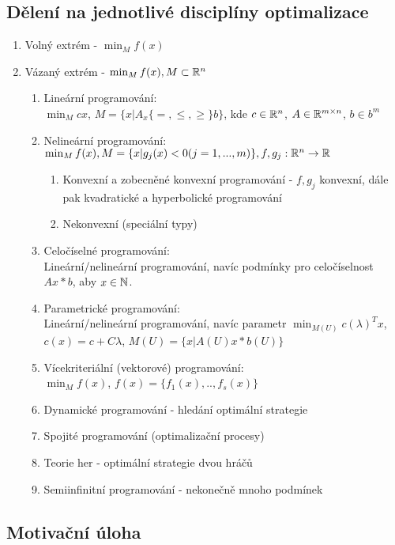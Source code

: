 \documentclass[a4paper,12pt,titlepage]{article}
\begin{document}
\subsection{Dělení na jednotlivé disciplíny optimalizace}
\setcounter{equation}{0}
\begin{enumerate}
	\item Volný extrém - $\min_M f(x)$
	\item Vázaný extrém - $\min_M f(x), M \subset \mathbb{R}^n$
	\begin{enumerate}
		\item Lineární programování: \\
			$\min_M cx$, $M = \{ x | A_x
			\{=,\le,\ge\}
			b\}$, kde $c \in \mathbb{R}^n$, $A \in \mathbb{R}^{m \times n}$, $b \in b^m$
		\item Nelineární programování: \\
			$\min_M f(x), M = \{ x | g_j(x) < 0 (j = 1, ..., m) \}, f, g_j:
			\mathbb{R}^n \to \mathbb{R}$
			\begin{enumerate}
				\item Konvexní a zobecněné konvexní programování - $f,g_j$
				konvexní, dále pak kvadratické a hyperbolické programování
				\item Nekonvexní (speciální typy)
			\end{enumerate}
		\item Celočíselné programování: \\
			Lineární/nelineární programování, navíc podmínky pro celočíselnost
			$Ax * b$, aby $x \in \mathbb{N}$.
		\item Parametrické programování: \\
			Lineární/nelineární programování, navíc parametr $\min_{M(U)} c
			(\lambda)^T x$, $c(x) = c + C\lambda$, $M(U) = \{ x | A(U) x * b(U)
			\}$
		\item Vícekriteriální (vektorové) programování: \\
			$\min_M f(x)$, $f(x) = \{f_1(x), .., f_s(x)\}$
		\item Dynamické programování - hledání optimální strategie
		\item Spojité programování (optimalizační procesy)
		\item Teorie her - optimální strategie dvou hráčů
		\item Semiinfinitní programování - nekonečně mnoho podmínek
	\end{enumerate}
\end{enumerate}

\subsection{Motivační úloha}
\setcounter{equation}{0}
\end{document}
